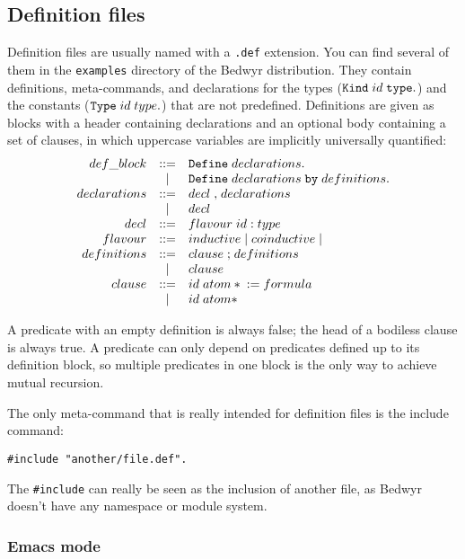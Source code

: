 \documentclass{article}
\begin{document}
\subsection{Definition files}

Definition files are usually named with a \verb|.def| extension. You can
find several of them in the \verb.examples. directory of the Bedwyr
distribution. They contain definitions, meta-commands, and declarations
for the types (${\tt Kind}\;id\;{\tt type.}$) and the constants (${\tt
Type}\;id\;type{\tt .}$) that are not predefined. Definitions are given
as blocks with a header containing declarations and an optional body
containing a set of clauses, in which uppercase variables are implicitly
universally quantified:
\[\begin{array}{rcl}
  def\_block    &::=& {\tt Define}\;declarations{\tt .} \\
                & | & {\tt Define}\;declarations\;{\tt by}\;
                     definitions{\tt.} \\
  declarations  &::=& decl\;{\tt,}\;declarations \\
                & | & decl\\
  decl          &::=& flavour\;id\;{\tt :}\;type \\
  flavour       &::=& inductive\;|\;coinductive\;|\\
  definitions   &::=& clause\;{\tt;}\;definitions \\
                & | & clause\\
  clause        &::=& id\;atom*\;{\tt:=}\;formula \\
                & | & id\;atom* \\
\end{array}\]

A predicate with an empty definition is always false;
the head of a bodiless clause is always true.
A predicate can only depend on predicates defined up to its definition
block, so multiple predicates in one block is the only way to achieve
mutual recursion.

The only meta-command that is really intended for definition files is the
include command:
\begin{verbatim}#include "another/file.def".\end{verbatim}
The \verb.#include. can really be seen as the inclusion of another file,
as Bedwyr doesn't have any namespace or module system.

\subsubsection{Emacs mode}
\end{document}
